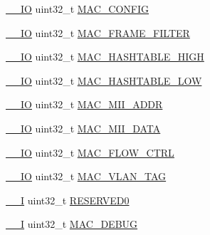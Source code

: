 \begin{DoxyCompactItemize}
\item 
\hyperlink{core__sc300_8h_aec43007d9998a0a0e01faede4133d6be}{\+\_\+\+\_\+\+IO} uint32\+\_\+t \hyperlink{struct_l_p_c___e_n_e_t___t_aa54e5cb311bed5d6b7cec2bacdf2166e}{M\+A\+C\+\_\+\+C\+O\+N\+F\+IG}
\item 
\hyperlink{core__sc300_8h_aec43007d9998a0a0e01faede4133d6be}{\+\_\+\+\_\+\+IO} uint32\+\_\+t \hyperlink{struct_l_p_c___e_n_e_t___t_ac8ef60ea97307bbd2338a1be5812a03b}{M\+A\+C\+\_\+\+F\+R\+A\+M\+E\+\_\+\+F\+I\+L\+T\+ER}
\item 
\hyperlink{core__sc300_8h_aec43007d9998a0a0e01faede4133d6be}{\+\_\+\+\_\+\+IO} uint32\+\_\+t \hyperlink{struct_l_p_c___e_n_e_t___t_ace12be20359f95fc315bdd8024717c22}{M\+A\+C\+\_\+\+H\+A\+S\+H\+T\+A\+B\+L\+E\+\_\+\+H\+I\+GH}
\item 
\hyperlink{core__sc300_8h_aec43007d9998a0a0e01faede4133d6be}{\+\_\+\+\_\+\+IO} uint32\+\_\+t \hyperlink{struct_l_p_c___e_n_e_t___t_ab7ed96a71dfe4b6683f6d7e66145dc21}{M\+A\+C\+\_\+\+H\+A\+S\+H\+T\+A\+B\+L\+E\+\_\+\+L\+OW}
\item 
\hyperlink{core__sc300_8h_aec43007d9998a0a0e01faede4133d6be}{\+\_\+\+\_\+\+IO} uint32\+\_\+t \hyperlink{struct_l_p_c___e_n_e_t___t_ad37bdfc0469b7bb9e69b83243688143f}{M\+A\+C\+\_\+\+M\+I\+I\+\_\+\+A\+D\+DR}
\item 
\hyperlink{core__sc300_8h_aec43007d9998a0a0e01faede4133d6be}{\+\_\+\+\_\+\+IO} uint32\+\_\+t \hyperlink{struct_l_p_c___e_n_e_t___t_a011e6d3b884dd21329e7567de7ae2bdd}{M\+A\+C\+\_\+\+M\+I\+I\+\_\+\+D\+A\+TA}
\item 
\hyperlink{core__sc300_8h_aec43007d9998a0a0e01faede4133d6be}{\+\_\+\+\_\+\+IO} uint32\+\_\+t \hyperlink{struct_l_p_c___e_n_e_t___t_ac8cb63da0b0c0db62794e1eb5c16e89c}{M\+A\+C\+\_\+\+F\+L\+O\+W\+\_\+\+C\+T\+RL}
\item 
\hyperlink{core__sc300_8h_aec43007d9998a0a0e01faede4133d6be}{\+\_\+\+\_\+\+IO} uint32\+\_\+t \hyperlink{struct_l_p_c___e_n_e_t___t_aa5610040f69b18b1510bab1358872e0d}{M\+A\+C\+\_\+\+V\+L\+A\+N\+\_\+\+T\+AG}
\item 
\hyperlink{core__sc300_8h_af63697ed9952cc71e1225efe205f6cd3}{\+\_\+\+\_\+I} uint32\+\_\+t \hyperlink{struct_l_p_c___e_n_e_t___t_a18f6b8d076ac69c4002cb7821674a163}{R\+E\+S\+E\+R\+V\+E\+D0}
\item 
\hyperlink{core__sc300_8h_af63697ed9952cc71e1225efe205f6cd3}{\+\_\+\+\_\+I} uint32\+\_\+t \hyperlink{struct_l_p_c___e_n_e_t___t_a6d7cea1b61d5661353263df4d5873643}{M\+A\+C\+\_\+\+D\+E\+B\+UG}

\end{DoxyCompactItemize}
